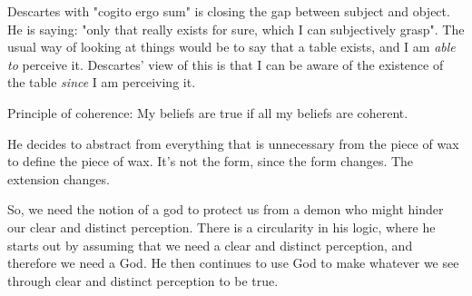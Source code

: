\documentclass[11pt]{book}
\begin{document}
Descartes with "cogito ergo sum" is closing the gap between subject and object.
He is saying: "only that really exists for sure, which I can subjectively
grasp". The usual way of looking at things would be to say that a table exists,
and I am \textit{able to} perceive it. Descartes' view of this is that I can be
aware of the existence of the table \textit{since} I am perceiving it.

Principle of coherence: My beliefs are true if all my beliefs are coherent.

He decides to abstract from everything that is unnecessary from the piece of
wax to define the piece of wax. It's not the form, since the form changes. The
extension changes.


So, we need the notion of a god to protect us from a demon who might hinder our
clear and distinct perception. There is a circularity in his logic, where he
starts out by assuming that we need a clear and distinct perception, and
therefore we need a God. He then continues to use God to make whatever we see
through clear and distinct perception to be true.
\end{document}
